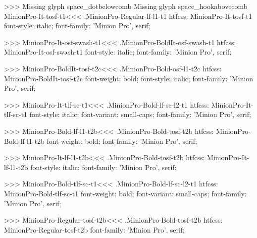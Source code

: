 {>>>
Missing glyph	space_dotbelowcomb
Missing glyph	space_hookabovecomb
\<MinionPro-It-tosf-t1\><<<
.MinionPro-Regular-lf-l1-t1
htfcss:  MinionPro-It-tosf-t1  font-style: italic; font-family: 'Minion Pro', serif;

>>>
\<MinionPro-It-osf-swash-t1\><<<
.MinionPro-BoldIt-osf-swash-t1
htfcss:  MinionPro-It-osf-swash-t1  font-style: italic; font-family: 'Minion Pro', serif;

>>>
\<MinionPro-BoldIt-tosf-t2c\><<<
.MinionPro-Bold-osf-l1-t2c
htfcss:  MinionPro-BoldIt-tosf-t2c  font-weight: bold; font-style: italic; font-family: 'Minion Pro', serif;

>>>
\<MinionPro-It-tlf-sc-t1\><<<
.MinionPro-Bold-lf-sc-l2-t1
htfcss:  MinionPro-It-tlf-sc-t1  font-style: italic; font-variant: small-caps; font-family: 'Minion Pro', serif;

>>>
\<MinionPro-Bold-lf-l1-t2b\><<<
.MinionPro-Bold-tosf-t2b
htfcss:  MinionPro-Bold-lf-l1-t2b  font-weight: bold; font-family: 'Minion Pro', serif;

>>>
\<MinionPro-It-lf-l1-t2b\><<<
.MinionPro-Bold-tosf-t2b
htfcss:  MinionPro-It-lf-l1-t2b  font-style: italic; font-family: 'Minion Pro', serif;

>>>
\<MinionPro-Bold-tlf-sc-t1\><<<
.MinionPro-Bold-lf-sc-l2-t1
htfcss:  MinionPro-Bold-tlf-sc-t1  font-weight: bold; font-variant: small-caps; font-family: 'Minion Pro', serif;

>>>
\<MinionPro-Regular-tosf-t2b\><<<
.MinionPro-Bold-tosf-t2b
htfcss:  MinionPro-Regular-tosf-t2b  font-family: 'Minion Pro', serif;

}
